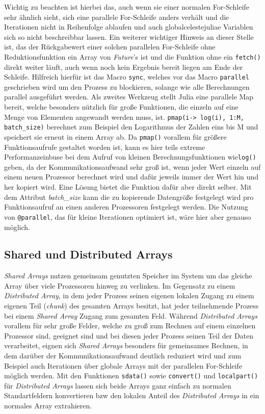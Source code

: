 \documentclass[proseminar,german,utf8]{zihpub}
\begin{document}
Wichtig zu beachten ist hierbei das, auch wenn sie einer normalen For-Schleife sehr ähnlich sieht, sich eine parallele For-Schleife anders verhält und die Iterationen nicht in Reihenfolge ablaufen und auch globalcelestejuliae Variablen sich so nicht beschreibbar lassen. Ein weiterer wichtiger Hinweis an dieser Stelle ist, das der Rückgabewert einer solchen parallelen For-Schleife ohne Reduktionsfunktion ein Array von \textit{Future}'s ist und die Funktion ohne ein \verb|fetch()| direkt weiter läuft, auch wenn noch kein Ergebnis bereit liegen am Ende der Schleife. Hilfreich hierfür ist das Macro \verb|sync|, welches vor das Macro \verb|parallel| geschrieben wird um den Prozess zu blockieren, solange wie alle Berechnungen parallel ausgeführt werden. Als zweites Werkzeug stellt Julia eine parallele Map bereit, welche besonders nützlich für große Funktionen, die einzeln auf eine Menge von Elementen angewandt werden muss, ist. \verb|pmap(i-> log(i), 1:M, batch_size)| berechnet zum Beispiel den Logarithmus der Zahlen eins bis M und speichert sie erneut in einem Array ab. Da \verb|pmap()| vorallem für größere Funktionsaufrufe gestaltet worden ist, kann es hier teils extreme Performanzeinbuse bei dem Aufruf von kleinen Berechnungsfunktionen wie\verb|log()| geben, da der Kommunikationsaufwand sehr groß ist, wenn jeder Wert einzeln auf einem neuen Prozessor berechnet wird und dafür jeweils immer der Wert hin und her kopiert wird. Eine Lösung bietet die Funktion dafür aber direkt selber. Mit dem Attribut \textit{batch\_size} kann die zu kopierende Datengröße festgelegt wird pro Funktionsaufruf an einen anderen Prozessoren festgelegt werden. Die Nutzung von \verb|@parallel|, das für kleine Iterationen optimiert ist, wäre hier aber genauso möglich.

\subsection{Shared und Distributed Arrays}

\textit{Shared Arrays} nutzen gemeinsam genutzten Speicher im System um das gleiche Array über viele Prozessoren hinweg zu verlinken. Im Gegensatz zu einem \textit{Distributed Array}, in dem jeder Prozess seinen eigenen lokalen Zugang zu einem eigenen Teil (\textit{chunk}) des gesamten Arrays besitzt, hat jeder teilnehmende Prozess bei einem \textit{Shared Array} Zugang zum gesamten Feld. Während \textit{Distributed Arrays} vorallem für sehr große Felder, welche zu groß zum Rechnen auf einem einzelnen Prozessor sind, geeignet sind und bei diesen jeder Prozess seinen Teil der Daten verarbeitet, eignen sich \textit{Shared Arrays} besonders für gemeinsames Rechnen, in dem darüber der Kommunikationsaufwand deutlich reduziert wird und zum Beispiel auch Iterationen über globale Arrays mit der parallelen For-Schleife möglich werden. Mit den Funktionen \verb|sdata()| sowie \verb|convert()| und \verb|localpart()| für \textit{Distributed Arrays} lassen sich beide Arrays ganz einfach zu normalen Standartfeldern konvertieren bzw den lokalen Anteil des\textit{ Distributed Arrays} in ein normales Array extrahieren. 
\end{document}
